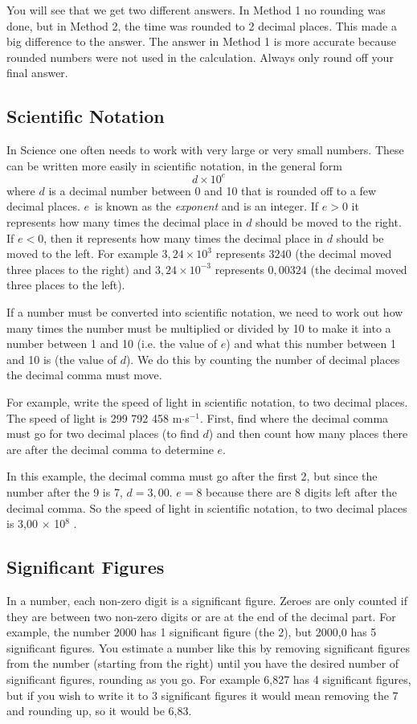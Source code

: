 You will see that we get two different answers. In Method 1 no rounding was done, but in Method 2, the time was rounded to 2 decimal places. This made a big difference to the answer. The answer in Method 1 is more accurate because rounded numbers were not used in the calculation. Always only round off your final answer.

\subsection{Scientific Notation}
In Science one often needs to work with very large or very small numbers. These can be written more easily in scientific notation, in the general form
\begin{equation*}
\label{mn:a:sci}
d \times 10^e
\end{equation*}
where $d$ is a decimal number between 0 and 10 that is rounded off to a few decimal places. $e$~is known as the \textit{exponent} and is an integer.
If $e>0$ it represents how many times the decimal place in $d$ should be moved to the right. If $e<0$, then it represents how many times the decimal place in $d$ should be moved to the left. For example $3,24\times 10^3$ represents $3240$ (the decimal moved three places to the right) and $3,24\times 10^{-3}$ represents $0,00324$ (the decimal moved three places to the left).

If a number must be converted into scientific notation, we need to work out how many times the number must be multiplied or divided by 10 to make it into a number between 1 and 10 (i.e. the value of $e$) and what this number between 1 and 10 is (the value of $d$). We do this by counting the number of decimal places the decimal comma must move.

For example, write the speed of light in scientific notation, to two decimal places. The speed of light is 299 792 458 m$\cdot$s$^{-1}$. First, find where the decimal comma must go for two decimal places (to find $d$) and then count how many places there are after the decimal comma to determine $e$.

In this example, the decimal comma must go after the first 2, but since the number after the 9 is 7, $d=3,00$. $e=8$ because there are 8 digits left after the decimal comma. So the speed of light in scientific notation, to two decimal places is 3,00 $\times$ 10$^{8}$ \ms.

\subsection{Significant Figures}
In a number, each non-zero digit is a significant figure. Zeroes are only counted if they are between two non-zero digits or are at the end of the decimal part. For example, the number 2000 has 1 significant figure (the 2), but 2000,0 has 5 significant figures. You estimate a number like this by removing significant figures from the number (starting from the right) until you have the desired number of significant figures, rounding as you go. For example 6,827 has 4 significant figures, but if you wish to write it to 3 significant figures it would mean removing the 7 and rounding up, so it would be 6,83. 

